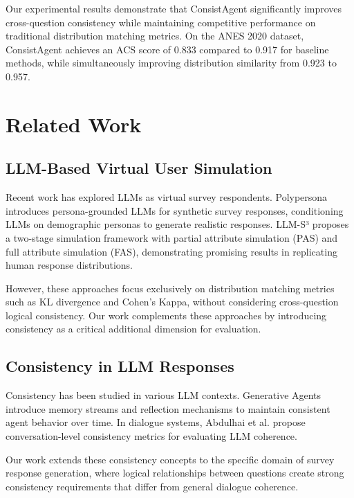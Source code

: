 \documentclass{article}
\begin{document}
Our experimental results demonstrate that ConsistAgent significantly improves cross-question consistency while maintaining competitive performance on traditional distribution matching metrics. On the ANES 2020 dataset, ConsistAgent achieves an ACS score of 0.833 compared to 0.917 for baseline methods, while simultaneously improving distribution similarity from 0.923 to 0.957.

\section{Related Work}

\subsection{LLM-Based Virtual User Simulation}

Recent work has explored LLMs as virtual survey respondents. Polypersona \cite{chen2025polypersona} introduces persona-grounded LLMs for synthetic survey responses, conditioning LLMs on demographic personas to generate realistic responses. LLM-S³ \cite{wang2025large} proposes a two-stage simulation framework with partial attribute simulation (PAS) and full attribute simulation (FAS), demonstrating promising results in replicating human response distributions.

However, these approaches focus exclusively on distribution matching metrics such as KL divergence and Cohen's Kappa, without considering cross-question logical consistency. Our work complements these approaches by introducing consistency as a critical additional dimension for evaluation.

\subsection{Consistency in LLM Responses}

Consistency has been studied in various LLM contexts. Generative Agents \cite{park2023generative} introduce memory streams and reflection mechanisms to maintain consistent agent behavior over time. In dialogue systems, Abdulhai et al. \cite{abdulhai2025measuring} propose conversation-level consistency metrics for evaluating LLM coherence.

Our work extends these consistency concepts to the specific domain of survey response generation, where logical relationships between questions create strong consistency requirements that differ from general dialogue coherence.
\end{document}
